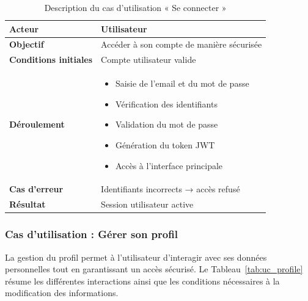 \begin{table}[H]
\centering
\renewcommand{\arraystretch}{1.2}
\begin{tabular}{|p{4cm}|p{10cm}|}
\hline
\textbf{Acteur} & Utilisateur \\ \hline

\textbf{Objectif} & Accéder à son compte de manière sécurisée \\ \hline

\textbf{Conditions initiales} & Compte utilisateur valide \\ \hline

\textbf{Déroulement} & 
\begin{itemize}
    \item Saisie de l’email et du mot de passe
    \item Vérification des identifiants
    \item Validation du mot de passe
    \item Génération du token JWT
    \item Accès à l’interface principale
\end{itemize} \\ \hline

\textbf{Cas d’erreur} & Identifiants incorrects → accès refusé \\ \hline

\textbf{Résultat} & Session utilisateur active \\ \hline
\end{tabular}
\caption{Description du cas d’utilisation « Se connecter »}
\label{tab:uc_login}
\end{table}

\subsubsection{Cas d’utilisation : Gérer son profil}

La gestion du profil permet à l’utilisateur d’interagir avec ses données personnelles tout en garantissant un accès sécurisé. Le Tableau~\ref{tab:uc_profile} résume les différentes interactions ainsi que les conditions nécessaires à la modification des informations.

